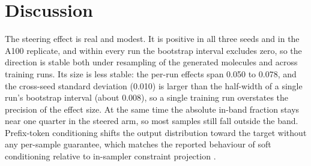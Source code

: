 \documentclass[11pt]{article}
\begin{document}
\begin{table}[t]
\centering
\caption{Progression across steering methods (three prior seeds $\times$ 10{,}000 fresh samples, band 400--450~nm; mean $\pm$ SD). Holdout ExtraTrees is excluded from all training rewards.}
\label{tab:round3-gnn}
\scriptsize
{}
\end{table}

\section{Discussion}

The steering effect is real and modest. It is positive in all three seeds and in the
A100 replicate, and within every run the bootstrap interval excludes zero, so the direction
is stable both under resampling of the generated molecules and across training runs. Its
size is less stable: the per-run effects span 0.050 to 0.078, and the cross-seed standard
deviation (0.010) is larger than the half-width of a single run's bootstrap interval (about
0.008), so a single training run overstates the precision of the effect size. At the same
time the absolute in-band fraction stays near one quarter in the steered arm, so most
samples still fall outside the band.
Prefix-token conditioning shifts the output distribution toward the target without any
per-sample guarantee, which matches the reported behaviour of soft conditioning relative
to in-sampler constraint projection \cite{cardei2025cdd, christopher2025nsd}.
\end{document}
